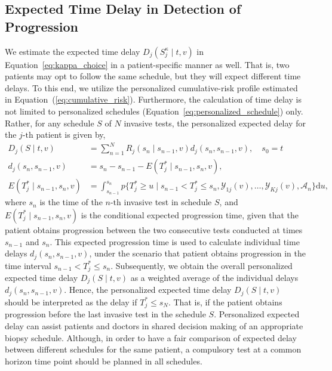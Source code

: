 \subsection{Expected Time Delay in Detection of Progression}
\label{subsec:exp_delay_estimation}
We estimate the expected time delay $D_j(S_j^{\kappa} \mid t, v)$ in Equation~\ref{eq:kappa_choice} in a patient-specific manner as well. That is, two patients may opt to follow the same schedule, but they will expect different time delays. To this end, we utilize the personalized cumulative-risk profile estimated in Equation~(\ref{eq:cumulative_risk}). Furthermore, the calculation of time delay is not limited to personalized schedules (Equation~\ref{eq:personalized_schedule}) only. Rather, for any schedule $S$ of $N$ invasive tests, the personalized expected delay for the ${j\mbox{-th}}$ patient is given by,
\begin{equation}
\label{eq:expected_delay}
\begin{split}
D_j(S \mid t, v) &= \sum_{n=1}^{N} R_j(s_n \mid s_{n-1}, v) d_j(s_n, s_{n-1}, v), \quad s_0 = t\\
d_j(s_n, s_{n-1}, v) &= s_n - s_{n-1} - E(T^*_j \mid s_{n-1}, s_n, v),\\
E(T^*_j \mid s_{n-1}, s_n, v) &= \int_{s_{n-1}}^{s_n} p\Big\{T^*_j \geq u \mid s_{n-1} < T^*_j \leq s_n, \mathcal{Y}_{1j}(v), \ldots, \mathcal{Y}_{Kj}(v), \mathcal{A}_n\Big\} \mathrm{d}u,
\end{split}
\end{equation}
where $s_n$ is the time of the ${n\mbox{-th}}$ invasive test in schedule $S$, and ${E(T^*_j \mid s_{n-1}, s_n, v)}$ is the conditional expected progression time, given that the patient obtains progression between the two consecutive tests conducted at times $s_{n-1}$ and $s_n$. This expected progression time is used to calculate individual time delays $d_j(s_n, s_{n-1}, v)$, under the scenario that patient obtains progression in the time interval $s_{n-1} < T^*_j \leq s_n$. Subsequently, we obtain the overall personalized expected time delay $D_j(S \mid t, v)$ as a weighted average of the individual delays $d_j(s_n, s_{n-1}, v)$. Hence, the personalized expected time delay $D_j(S \mid t, v)$ should be interpreted as the delay if $T^*_j \leq s_N$. That is, if the patient obtains progression before the last invasive test in the schedule $S$. Personalized expected delay can assist patients and doctors in shared decision making of an appropriate biopsy schedule. Although, in order to have a fair comparison of expected delay between different schedules for the same patient, a compulsory test at a common horizon time point should be planned in all schedules.